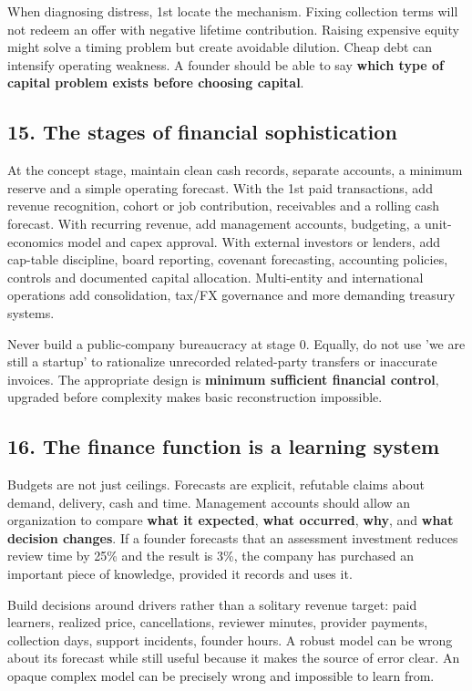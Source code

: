 When diagnosing distress, 1st locate the mechanism. Fixing collection terms will not redeem an offer with negative lifetime contribution. Raising expensive equity might solve a timing problem but create avoidable dilution. Cheap debt can intensify operating weakness. A founder should be able to say \textbf{which type of capital problem exists before choosing capital}.

\subsection{15. The stages of financial sophistication}


At the concept stage, maintain clean cash records, separate accounts, a minimum reserve and a simple operating forecast. With the 1st paid transactions, add revenue recognition, cohort or job contribution, receivables and a rolling cash forecast. With recurring revenue, add management accounts, budgeting, a unit-economics model and capex approval. With external investors or lenders, add cap-table discipline, board reporting, covenant forecasting, accounting policies, controls and documented capital allocation. Multi-entity and international operations add consolidation, tax/FX governance and more demanding treasury systems.

Never build a public-company bureaucracy at stage 0. Equally, do not use 'we are still a startup' to rationalize unrecorded related-party transfers or inaccurate invoices. The appropriate design is \textbf{minimum sufficient financial control}, upgraded before complexity makes basic reconstruction impossible.

\subsection{16. The finance function is a learning system}


Budgets are not just ceilings. Forecasts are explicit, refutable claims about demand, delivery, cash and time. Management accounts should allow an organization to compare \textbf{what it expected}, \textbf{what occurred}, \textbf{why}, and \textbf{what decision changes}. If a founder forecasts that an assessment investment reduces review time by 25\% and the result is 3\%, the company has purchased an important piece of knowledge, provided it records and uses it.

Build decisions around drivers rather than a solitary revenue target: paid learners, realized price, cancellations, reviewer minutes, provider payments, collection days, support incidents, founder hours. A robust model can be wrong about its forecast while still useful because it makes the source of error clear. An opaque complex model can be precisely wrong and impossible to learn from.

